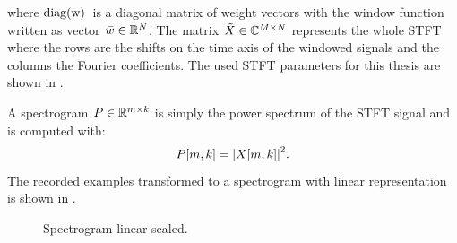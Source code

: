 where $\mathrm{diag(w)\,}$ is a diagonal matrix of weight vectors with the window function written as vector $\bar{w} \in \mathbb{R}^N$.
The matrix $\tilde{X} \in \mathbb{C}^{M \times N}$ represents the whole STFT where the rows are the shifts on the time axis of the windowed signals and the columns the Fourier coefficients.
The used STFT parameters for this thesis are shown in .

A spectrogram $P \in \mathbb{R}^{m \times k}$ is simply the power spectrum of the STFT signal and is computed with:
\begin{equation}\label{eq:signal_spec_spec}
  P[m, k] = \abs{X[m, k]}^2.
\end{equation}
The recorded examples transformed to a spectrogram with linear representation is shown in .
\begin{figure}[!ht]
  \centering
  \caption{Spectrogram linear scaled.}
  \label{fig:signal_spec_lin_showcase}
\end{figure}
